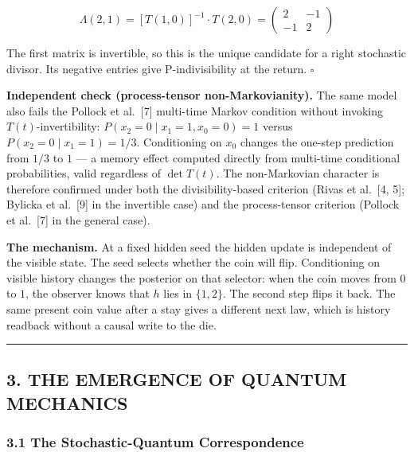 \documentclass[
]{article}
\begin{document}
\[\Lambda(2,1) = [T(1,0)]^{-1} \cdot T(2,0) = \begin{pmatrix} 2 & -1 \\ -1 & 2 \end{pmatrix}\]

The first matrix is invertible, so this is the unique candidate for a
right stochastic divisor. Its negative entries give P-indivisibility at
the return. \(\square\)

\textbf{Independent check (process-tensor non-Markovianity).} The same
model also fails the Pollock et al.~{[}7{]} multi-time Markov condition
without invoking \(T(t)\)-invertibility:
\(P(x_2 = 0 \mid x_1 = 1, x_0 = 0) = 1\) versus
\(P(x_2 = 0 \mid x_1 = 1) = 1/3\). Conditioning on \(x_0\) changes the
one-step prediction from \(1/3\) to \(1\) --- a memory effect computed
directly from multi-time conditional probabilities, valid regardless of
\(\det T(t)\). The non-Markovian character is therefore confirmed under
both the divisibility-based criterion (Rivas et al.~{[}4, 5{]}; Bylicka
et al.~{[}9{]} in the invertible case) and the process-tensor criterion
(Pollock et al.~{[}7{]} in the general case).

\textbf{The mechanism.} At a fixed hidden seed the hidden update is
independent of the visible state. The seed selects whether the coin will
flip. Conditioning on visible history changes the posterior on that
selector: when the coin moves from \(0\) to \(1\), the observer knows
that \(h\) lies in \(\{1,2\}\). The second step flips it back. The same
present coin value after a stay gives a different next law, which is
history readback without a causal write to the die.

\begin{center}\rule{0.5\linewidth}{0.5pt}\end{center}

\hypertarget{the-emergence-of-quantum-mechanics}{%
\subsection{3. THE EMERGENCE OF QUANTUM
MECHANICS}\label{the-emergence-of-quantum-mechanics}}

\hypertarget{the-stochastic-quantum-correspondence}{%
\subsubsection{3.1 The Stochastic-Quantum
Correspondence}\label{the-stochastic-quantum-correspondence}}
\end{document}
